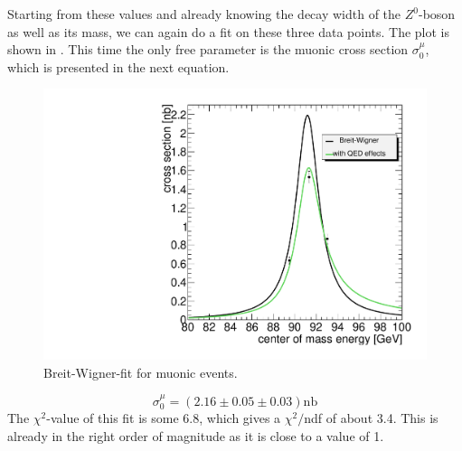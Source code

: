 \documentclass[epj,nopacs]{svjour}
\begin{document}
Starting from these values and already knowing the decay width of the
$Z^0$-boson as well as its mass, we can again do a fit on these three data
points. The plot is shown in . This time the only free
parameter is the muonic cross section $σ_0^μ$, which is presented in the next
equation.
\begin{figure}[htb]
 \centering
 \includegraphics[width=1\columnwidth,keepaspectratio]{finalmu_fit}
 \caption{Breit-Wigner-fit for muonic events.}
 \label{fig:fit_muons}
\end{figure}
\begin{equation}
\nonumber σ_0^μ = (2.16 \pm 0.05 \pm 0.03) \si{\nano\barn}
\end{equation}
The $χ^2$-value of this fit is some 6.8, which gives a $χ^2/$ndf of about 3.4.
This is already in the right order of magnitude as it is close to a value of 1.
\end{document}
